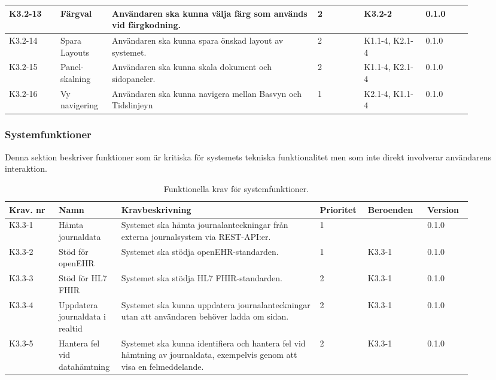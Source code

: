 \documentclass{article}
\begin{document}
\begin{table}[H]
\begin{tabular}{|p{0.1\linewidth}|p{0.1\linewidth}|p{0.4\linewidth}|p{0.09\linewidth}|p{0.12\linewidth}|p{0.09\linewidth}|}
        K3.2-13 & Färgval & Användaren ska kunna välja färg som används vid färgkodning. & 2 & K3.2-2 & 0.1.0\\ \hline
        K3.2-14 & Spara Layouts & Användaren ska kunna spara önskad layout av systemet. & 2 & K1.1-4, K2.1-4 & 0.1.0\\ \hline
        K3.2-15 & Panel-skalning & Användaren ska kunna skala dokument och sidopaneler. & 2 & K1.1-4, K2.1-4 & 0.1.0\\ \hline
        K3.2-16 & Vy navigering & Användaren ska kunna navigera mellan Basvyn och Tidslinjeyn & 1 & K2.1-4, K1.1-4 & 0.1.0\\ \hline
    \end{tabular}
\end{table}

\newpage
\subsubsection{Systemfunktioner}
Denna sektion beskriver funktioner som är kritiska för systemets tekniska funktionalitet men som inte direkt involverar användarens interaktion.

\begin{table}[H]
    \caption{Funktionella krav för systemfunktioner.} 
    \label{tab:systemfunktioner} 
    \centering
    \begin{tabular}{|p{0.1\linewidth}|p{0.1\linewidth}|p{0.4\linewidth}|p{0.09\linewidth}|p{0.12\linewidth}|p{0.09\linewidth}|}
        \hline
        \textbf{Krav. nr} & \textbf{Namn} & \textbf{Kravbeskrivning} & \textbf{Prioritet} & \textbf{Beroenden}  & \textbf{Version} \\ \hline
        K3.3-1 & Hämta journaldata & Systemet ska hämta journalanteckningar från externa journalsystem via REST-API:er. & 1 & & 0.1.0\\ \hline
        K3.3-2 & Stöd för openEHR & Systemet ska stödja openEHR-standarden. & 1 & K3.3-1 & 0.1.0\\ \hline
        K3.3-3 & Stöd för HL7 FHIR & Systemet ska stödja HL7 FHIR-standarden. & 2 & K3.3-1 & 0.1.0\\ \hline
        K3.3-4 & Uppdatera journaldata i realtid & Systemet ska kunna uppdatera journalanteckningar utan att användaren behöver ladda om sidan. & 2 & K3.3-1 & 0.1.0\\ \hline
        K3.3-5 & Hantera fel vid datahämtning & Systemet ska kunna identifiera och hantera fel vid hämtning av journaldata, exempelvis genom att visa en felmeddelande. & 2 & K3.3-1 & 0.1.0\\ \hline
    \end{tabular}
\end{table}
\end{document}
